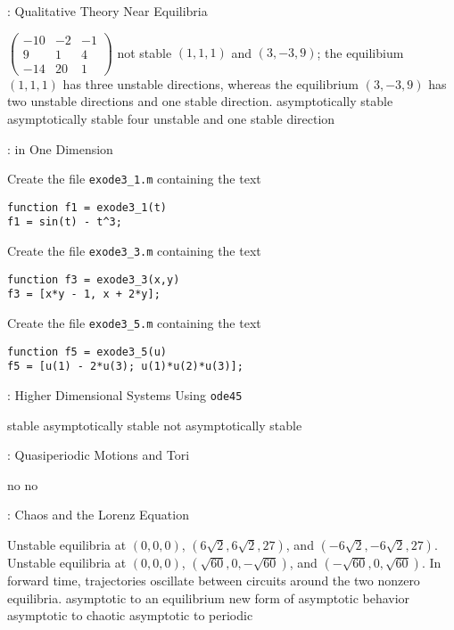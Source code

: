 : Qualitative Theory Near Equilibria

 \ans $\left(\begin{array}{rrr}
-10 & -2 & -1\\ 9 & 1 & 4 \\ -14 & 20 & 1\end{array}\right)$
 \ans not stable
 \ans $(1,1,1)$ and $(3,-3,9)$; the equilibium $(1,1,1)$ has 
three unstable directions, whereas the equilibrium $(3,-3,9)$ has two 
unstable directions and one stable direction.
\ans asymptotically stable
\ans asymptotically stable
 \ans four unstable and one stable direction


:  in One Dimension

Create the file {\tt exode3\_1.m} containing the text
\begin{verbatim}
function f1 = exode3_1(t)
f1 = sin(t) - t^3;
\end{verbatim}

Create the file {\tt exode3\_3.m} containing the text
\begin{verbatim}
function f3 = exode3_3(x,y)
f3 = [x*y - 1, x + 2*y];
\end{verbatim}

Create the file {\tt exode3\_5.m} containing the text
\begin{verbatim}
function f5 = exode3_5(u)
f5 = [u(1) - 2*u(3); u(1)*u(2)*u(3)];
\end{verbatim}


: Higher Dimensional Systems Using {\tt ode45}

 \ans stable
 \ans asymptotically stable 
  \ans not asymptotically stable


: Quasiperiodic Motions and Tori

 \ans no
 \ans no


: Chaos and the Lorenz Equation

 \ans Unstable equilibria at $(0,0,0)$, 
$(6\sqrt{2},6\sqrt{2},27)$, and $(-6\sqrt{2},-6\sqrt{2},27)$.
\ans Unstable equilibria at $(0,0,0)$, $(\sqrt{60},0, -\sqrt{60})$, and 
$(-\sqrt{60},0,\sqrt{60})$.  In forward time, trajectories oscillate between 
circuits around the two nonzero equilibria.
 \ans asymptotic to an equilibrium
 \ans new form of asymptotic behavior
  \ans asymptotic to chaotic
 \ans asymptotic to periodic


